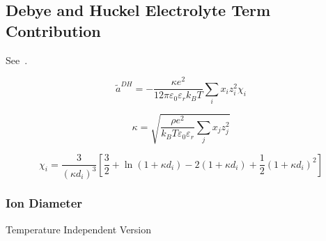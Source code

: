 \documentclass[12pt, letterpaper]{article}
\begin{document}
\subsection{Debye and Huckel Electrolyte Term Contribution}

See~\cite{Bulow2019}.

\begin{equation}
    \tilde{a}^{DH}=-\frac{\kappa e^{2}}{12\pi\varepsilon_{0}\varepsilon_{r}k_{B}T}\sum_{i}x_{i}z_{i}^{2}\chi_{i}
    \label{eq:ares_dh}
\end{equation}


\begin{equation}
    \kappa=\sqrt{\frac{\rho e^{2}}{k_{B}T\varepsilon_{0}\varepsilon_{r}}\sum_{j}x_{j}z_{j}^{2}}
    \label{eq:kappa_dh}
\end{equation}


\begin{equation}
    \chi_{i}=\frac{3}{\left(\kappa d_{i}\right)^3}\left[\frac{3}{2}+\ln(1+\kappa d_{i})-2(1+\kappa d_{i})+\frac{1}{2}\left(1+\kappa d_{i}\right)^2\right]
    \label{eq:chi_dh}
\end{equation}

\subsubsection{Ion Diameter}

Temperature Independent Version
\end{document}
